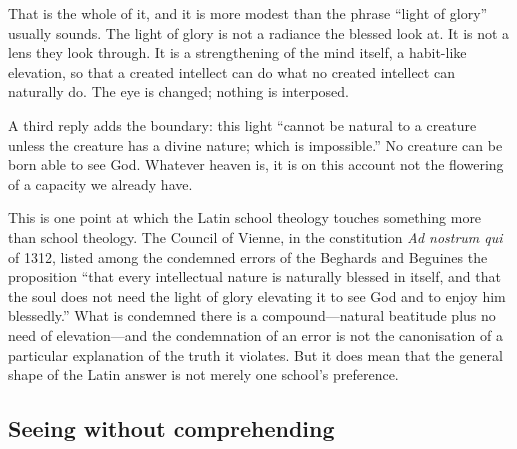 That is the whole of it, and it is more modest than the phrase ``light of glory'' usually sounds. The light of glory is not a radiance the blessed look at. It is not a lens they look through. It is a strengthening of the mind itself, a habit-like elevation, so that a created intellect can do what no created intellect can naturally do. The eye is changed; nothing is interposed.

A third reply adds the boundary: this light ``cannot be natural to a creature unless the creature has a divine nature; which is impossible.'' No creature can be born able to see God. Whatever heaven is, it is on this account not the flowering of a capacity we already have.

This is one point at which the Latin school theology touches something more than school theology. The Council of Vienne, in the constitution \emph{Ad nostrum qui} of 1312, listed among the condemned errors of the Beghards and Beguines the proposition ``that every intellectual nature is naturally blessed in itself, and that the soul does not need the light of glory elevating it to see God and to enjoy him blessedly.'' What is condemned there is a compound---natural beatitude plus no need of elevation---and the condemnation of an error is not the canonisation of a particular explanation of the truth it violates. But it does mean that the general shape of the Latin answer is not merely one school's preference.

\subsection{Seeing without comprehending}

